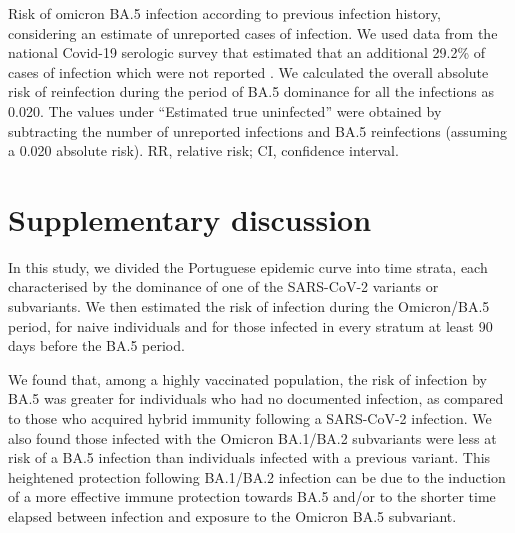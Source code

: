\begin{table}
    \centering
    \caption[Risk of omicron BA.5 infection according to previous infection history, considering an estimate of unreported cases of infection]{Risk of omicron BA.5 infection according to previous infection history, considering an estimate of unreported cases of infection. We used data from the national Covid-19 serologic survey that estimated that an additional 29.2\% of cases of infection which were not reported \citep{institutonacionaldesaudedoutorricardojorge2021NationalCOVID19}. We calculated the overall absolute risk of reinfection during the period of BA.5 dominance for all the infections as 0.020. The values under ``Estimated true uninfected'' were obtained by subtracting the number of unreported infections and BA.5 reinfections (assuming a 0.020 absolute risk). RR, relative risk; CI, confidence interval.}
    \resizebox{\textwidth}{!}{}
    \label{tab:tabs3-risk-infection-sensitivity}
\end{table}

\section{Supplementary discussion}
\label{sec:2022-covid19-01-discussion}

In this study, we divided the Portuguese epidemic curve into time strata, each characterised by the dominance of one of the SARS-CoV-2 variants or subvariants. We then estimated the risk of infection during the Omicron/BA.5 period, for naive individuals and for those infected in every stratum at least 90 days before the BA.5 period.

We found that, among a highly vaccinated population, the risk of infection by BA.5 was greater for individuals who had no documented infection, as compared to those who acquired hybrid immunity following a SARS-CoV-2 infection. We also found those infected with the Omicron BA.1/BA.2 subvariants were less at risk of a BA.5 infection than individuals infected with a previous variant. This heightened protection following BA.1/BA.2 infection can be due to the induction of a more effective immune protection towards BA.5 and/or to the shorter time elapsed between infection and exposure to the Omicron BA.5 subvariant.


